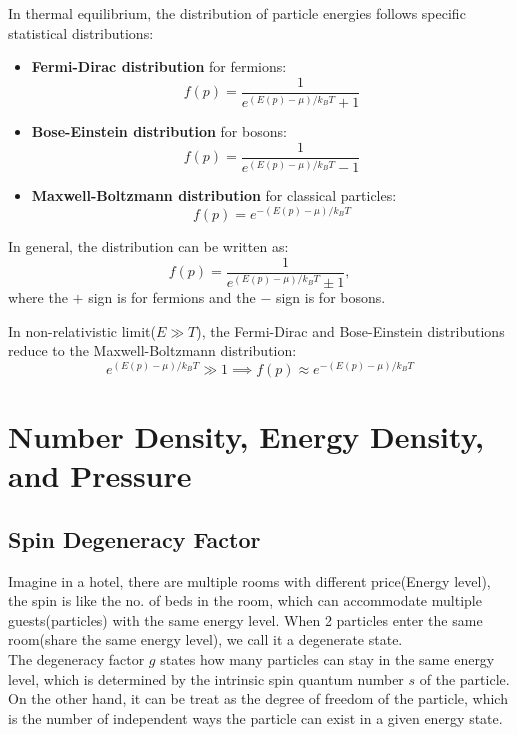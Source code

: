 \clearpage
\begin{theory}
  In thermal equilibrium, the distribution of particle energies follows specific statistical distributions:
  \begin{itemize}
    \item \textbf{Fermi-Dirac distribution} for fermions:
    \[
      f(p) = \frac{1}{e^{(E(p)-\mu)/k_B T} + 1}
    \]
    \item \textbf{Bose-Einstein distribution} for bosons:
    \[
      f(p) = \frac{1}{e^{(E(p)-\mu)/k_B T} - 1}
    \]
    \item \textbf{Maxwell-Boltzmann distribution} for classical particles:
    \[
      f(p) = e^{-(E(p)-\mu)/k_B T}
    \]
    \end{itemize}

  In general, the distribution can be written as:
    \[
        f(p) = \frac{1}{e^{(E(p)-\mu)/k_B T} \pm 1},
    \]
  where the $+$ sign is for fermions and the $-$ sign is for bosons.
\end{theory}

\bigskip\noindent
\begin{theory}
    In non-relativistic limit($ E \gg T $), the Fermi-Dirac and Bose-Einstein distributions reduce to the Maxwell-Boltzmann distribution:
    \[
        e^{(E(p) - \mu)/k_B T} \gg 1 \implies f(p) \approx e^{-(E(p)-\mu)/k_B T}
    \]
\end{theory}

\clearpage
\section{Number Density, Energy Density, and Pressure}
\subsection{Spin Degeneracy Factor}
\begin{intuition}
    Imagine in a hotel, there are multiple rooms with different price(Energy level), the spin is like the no. of beds in the room, which can accommodate multiple guests(particles) with the same energy level. 
    When 2 particles enter the same room(share the same energy level), we call it a degenerate state. \\

    The degeneracy factor $g$ states how many particles can stay in the same energy level, which is determined by the intrinsic spin quantum number $s$ of the particle. On the other hand, it can be treat as the degree of freedom of the particle, which is the number of independent ways the particle can exist in a given energy state.
\end{intuition}

